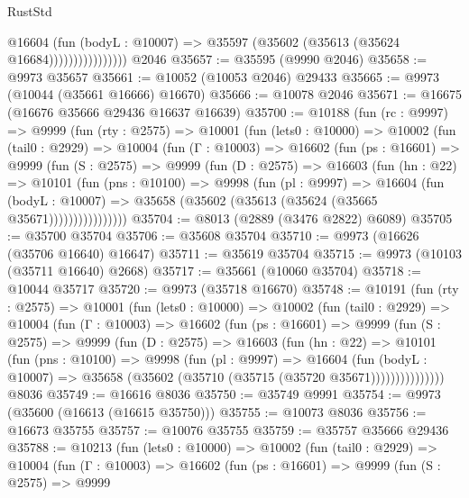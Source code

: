 \begin{lexlean}{RustStd}
\begin{coremodule}
                          @16604
                            (fun (bodyL : @10007) =>
                            @35597 (@35602 (@35613 (@35624 @16684))))))))))))))))
    @2046
@35657 := @35595 (@9990 @2046)
@35658 := @9973 @35657
@35661 := @10052 (@10053 @2046) @29433
@35665 := @9973 (@10044 (@35661 @16666) @16670)
@35666 := @10078 @2046
@35671 := @16675 (@16676 @35666 @29436 @16637 @16639)
@35700 := @10188
    (fun (rc : @9997) =>
    @9999
      (fun (rty : @2575) =>
      @10001
        (fun (lets0 : @10000) =>
        @10002
          (fun (tail0 : @2929) =>
          @10004
            (fun (Γ : @10003) =>
            @16602
              (fun (ps : @16601) =>
              @9999
                (fun (S : @2575) =>
                @9999
                  (fun (D : @2575) =>
                  @16603
                    (fun (hn : @22) =>
                    @10101
                      (fun (pns : @10100) =>
                      @9998
                        (fun (pl : @9997) =>
                        @16604
                          (fun (bodyL : @10007) =>
                          @35658 (@35602 (@35613 (@35624 (@35665 @35671))))))))))))))))
@35704 := @8013 (@2889 (@3476 @2822) @6089)
@35705 := @35700 @35704
@35706 := @35608 @35704
@35710 := @9973 (@16626 (@35706 @16640) @16647)
@35711 := @35619 @35704
@35715 := @9973 (@10103 (@35711 @16640) @2668)
@35717 := @35661 (@10060 @35704)
@35718 := @10044 @35717
@35720 := @9973 (@35718 @16670)
@35748 := @10191
    (fun (rty : @2575) =>
    @10001
      (fun (lets0 : @10000) =>
      @10002
        (fun (tail0 : @2929) =>
        @10004
          (fun (Γ : @10003) =>
          @16602
            (fun (ps : @16601) =>
            @9999
              (fun (S : @2575) =>
              @9999
                (fun (D : @2575) =>
                @16603
                  (fun (hn : @22) =>
                  @10101
                    (fun (pns : @10100) =>
                    @9998
                      (fun (pl : @9997) =>
                      @16604
                        (fun (bodyL : @10007) =>
                        @35658 (@35602 (@35710 (@35715 (@35720 @35671)))))))))))))))
    @8036
@35749 := @16616 @8036
@35750 := @35749 @9991
@35754 := @9973 (@35600 (@16613 (@16615 @35750)))
@35755 := @10073 @8036
@35756 := @16673 @35755
@35757 := @10076 @35755
@35759 := @35757 @35666 @29436
@35788 := @10213
    (fun (lets0 : @10000) =>
    @10002
      (fun (tail0 : @2929) =>
      @10004
        (fun (Γ : @10003) =>
        @16602
          (fun (ps : @16601) =>
          @9999
            (fun (S : @2575) =>
            @9999

\end{coremodule}
\end{lexlean}
